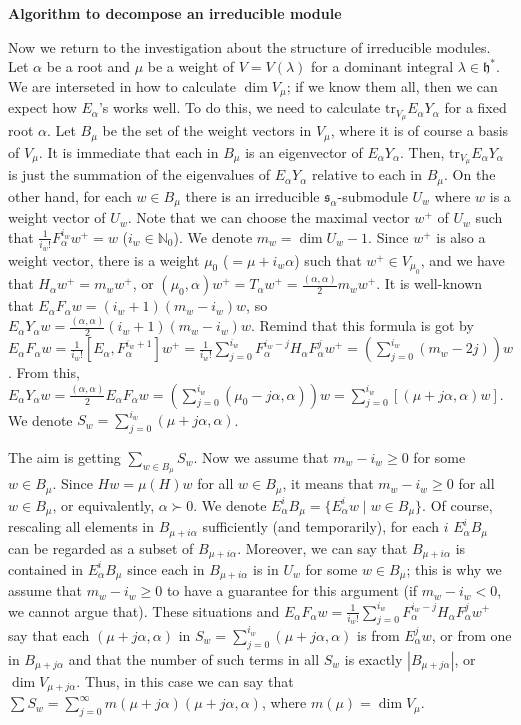 \documentclass{article}
\newcommand{\NaN}{\mathbb{N}}
\newcommand{\SBar}{\;|\;}
\newcommand{\tru}[2]{\mathrm{tr}_{#1}#2}
\newcommand{\lie}[1]{\mathfrak{#1}}
\begin{document}
\newpage

\textbf{Algorithm to decompose an irreducible module}

Now we return to the investigation about the structure of irreducible modules.
Let $\alpha$ be a root and $\mu$ be a weight of $V = V(\lambda)$ for a dominant integral $\lambda \in\lie{h}^*$.
We are interseted in how to calculate $\dim{V_\mu}$; if we know them all, then we can expect how $E_\alpha$'s works well.
To do this, we need to calculate $\tru{V_\mu}{E_\alpha Y_\alpha}$ for a fixed root $\alpha$.
Let $B_\mu$ be the set of the weight vectors in $V_\mu$, where it is of course a basis of $V_\mu$.
It is immediate that each in $B_\mu$ is an eigenvector of $E_\alpha Y_\alpha$.
Then, $\tru{V_\mu}{E_\alpha Y_\alpha}$ is just the summation of the eigenvalues of $E_\alpha Y_\alpha$ relative to each in $B_\mu$.
On the other hand, for each $w \in B_\mu$ there is an irreducible $\lie{s}_\alpha$-submodule $U_w$ where $w$ is a weight vector of $U_w$.
Note that we can choose the maximal vector $w^+$ of $U_w$ such that $\frac{1}{i_w!} F_\alpha^{i_w} w^+ = w$ ($i_w \in \NaN_0$).
We denote $m_w = \dim{U_w} - 1$.
Since $w^+$ is also a weight vector, there is a weight $\mu_0$ ($=\mu + i_w \alpha$) such that $w^+ \in V_{\mu_0}$, and we have that $H_\alpha w^+ = m_w w^+$, or $(\mu_0, \alpha) w^+ = T_\alpha w^+ = \frac{(\alpha, \alpha)}{2} m_w w^+$.
It is well-known that $E_\alpha F_\alpha w = (i_w + 1)(m_w - i_w) w$, so $E_\alpha Y_\alpha w = \frac{(\alpha, \alpha)}{2} (i_w + 1)(m_w - i_w) w$.
Remind that this formula is got by $E_\alpha F_\alpha w = \frac{1}{i_w!}[E_\alpha, F_\alpha^{i_w + 1}]w^+ = \frac{1}{i_w!} \sum_{j = 0}^{i_w} F_\alpha^{i_w - j} H_\alpha F_\alpha^j w^+ = (\sum_{j = 0}^{i_w} (m_w - 2j)) w$.
From this, $E_\alpha Y_\alpha w = \frac{(\alpha, \alpha)}{2} E_\alpha F_\alpha w = (\sum_{j = 0}^{i_w} (\mu_0 - j\alpha, \alpha)) w = \sum_{j = 0}^{i_w} [(\mu + j\alpha, \alpha) w]$.
We denote $S_w = \sum_{j = 0}^{i_w} (\mu + j\alpha, \alpha)$.

The aim is getting $\sum_{w \in B_\mu} S_w$.
Now we assume that $m_w - i_w \ge 0$ for some $w \in B_\mu$.
Since $Hw = \mu(H)w$ for all $w \in B_\mu$, it means that $m_w - i_w \ge 0$ for all $w \in B_\mu$, or equivalently, $\alpha \succ 0$.
We denote $E_\alpha^i B_\mu = \{E_\alpha^i w \SBar w \in B_\mu\}$.
Of course, rescaling all elements in $B_{\mu + i\alpha}$ sufficiently (and temporarily), for each $i$ $E_\alpha^i B_\mu$ can be regarded as a subset of $B_{\mu + i\alpha}$.
Moreover, we can say that $B_{\mu + i\alpha}$ is contained in $E_\alpha^i B_\mu$ since each in $B_{\mu + i\alpha}$ is in $U_w$ for some $w \in B_\mu$; this is why we assume that $m_w - i_w \ge 0$ to have a guarantee for this argument (if $m_w - i_w < 0$, we cannot argue that).
These situations and $E_\alpha F_\alpha w = \frac{1}{i_w!} \sum_{j = 0}^{i_w} F_\alpha^{i_w - j} H_\alpha F_\alpha^j w^+$ say that each $(\mu + j\alpha, \alpha)$ in $S_w = \sum_{j = 0}^{i_w} (\mu + j\alpha, \alpha)$ is from $E_\alpha^j w$, or from one in $B_{\mu + j\alpha}$ and that the number of such terms in all $S_w$ is exactly $|B_{\mu + j\alpha}|$, or $\dim{V_{\mu + j\alpha}}$.
Thus, in this case we can say that $\sum S_w = \sum_{j = 0}^\infty m(\mu + j\alpha) (\mu + j\alpha, \alpha)$, where $m(\mu) = \dim{V_\mu}$.
\end{document}
